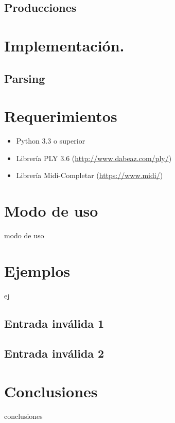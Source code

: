 \documentclass[a4paper,8pt]{article}
\begin{document}
\subsection{Producciones}

\section{Implementación.}
\subsection{Parsing}

\section{Requerimientos}
	\begin{itemize}
  		\item Python 3.3 o superior
  		\item Librería PLY 3.6 (\url{http://www.dabeaz.com/ply/})
  		\item Librería Midi-Completar (\url{https://www.midi/})
	\end{itemize}

\section{Modo de uso}
modo de uso


\section{Ejemplos}
ej
\subsection{Entrada inválida 1}
\subsection{Entrada inválida 2}



\section{Conclusiones}
conclusiones

\newpage
\end{document}
